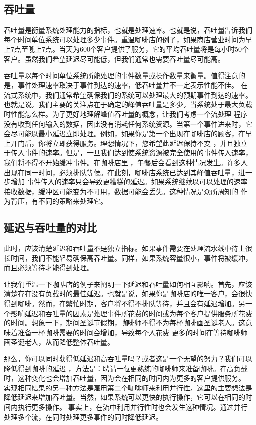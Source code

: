 \documentclass[cn,11pt,chinese]{elegantbook}
\begin{document}
\subsection{吞吐量}

吞吐量是衡量系统处理能力的指标，也就是处理速率。也就是说，吞吐量告诉我们每个时间单位系统可以处理多少事件。重温咖啡店的例子，如果商店营业时间为早上7点至晚上7点。当天为600个客户提供了服务，它的平均吞吐量将是每小时50个客户。虽然我们希望延迟尽可能低，但我们通常也需要吞吐量尽可能高。

吞吐量以每个时间单位系统所能处理的事件数量或操作数量来衡量。值得注意的是，事件处理速率取决于事件到达的速率，低吞吐量并不一定表示性能不佳。 在流式系统中，我们通常希望确保我们的系统可以处理最大的预期事件到达的速率。也就是说，我们主要的关注点在于确定的峰值吞吐量是多少，当系统处于最大负载时性能怎么样。为了更好地理解峰值吞吐量的概念，让我们考虑一个流处理 程序没有收到任何输入的数据，因此没有消耗任何系统资源。当第一个事件进来时，它会尽可能以最小延迟立即处理。例如，如果你是第一个出现在咖啡店的顾客，在早上开门后，你将立即获得服务。理想情况下，您希望此延迟保持不变 ，并且独立于传入事件的速率。但是，一旦我们达到使系统资源被完全使用的事件传入速率，我们将不得不开始缓冲事件。在咖啡店里 ，午餐后会看到这种情况发生。许多人出现在同一时间，必须排队等候。在此刻，咖啡店系统已达到其峰值吞吐量，进一步增加 事件传入的速率只会导致更糟糕的延迟。如果系统继续以可以处理的速率接收数据，缓冲区可能变为不可用，数据可能会丢失。这种情况是众所周知的 作为背压，有不同的策略来处理它。

\subsection{延迟与吞吐量的对比}

此时，应该清楚延迟和吞吐量不是独立指标。如果事件需要在处理流水线中待上很长时间，我们不能轻易确保高吞吐量。同样，如果系统容量很小，事件将被缓冲，而且必须等待才能得到处理。

让我们重温一下咖啡店的例子来阐明一下延迟和吞吐量如何相互影响。首先，应该清楚存在没有负载时的最佳延迟。也就是说，如果你是咖啡店的唯一客户，会很快得到咖啡。然而，在繁忙时期，客户将不得不排队等待，并且会有延迟增加。另一个影响延迟和吞吐量的因素是处理事件所花费的时间或为每个客户提供服务所花费的时间。想象一下，期间圣诞节假期，咖啡师不得不为每杯咖啡画圣诞老人。这意味着准备一杯咖啡需要的时间会增加，导致每个人花费 更多的时间在等待咖啡师画圣诞老人，从而降低整体吞吐量。

那么，你可以同时获得低延迟和高吞吐量吗？或者这是一个无望的努力？我们可以降低得到咖啡的延迟 ，方法是：聘请一位更熟练的咖啡师来准备咖啡。在高负载时，这种变化也会增加吞吐量，因为会在相同的时间内为更多的客户提供服务。 实现相同结果的另一种方法是雇用第二个咖啡师来利用并行性。这里的主要想法是降低延迟来增加吞吐量。当然，如果系统可以更快的执行操作，它可以在相同的时间内执行更多操作。 事实上，在流中利用并行性时也会发生这种情况。通过并行处理多个流，在同时处理更多事件的同时降低延迟。
\end{document}

